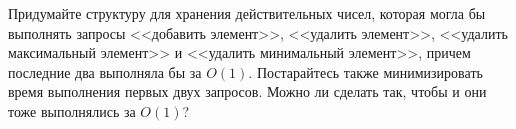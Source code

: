 \documentclass{article}
\begin{document}
Придумайте структуру для хранения действительных чисел, которая могла бы выполнять запросы <<добавить элемент>>,
<<удалить элемент>>, <<удалить максимальный элемент>> и <<удалить минимальный элемент>>, причем последние два выполняла бы за $O(1)$. Постарайтесь также минимизировать время выполнения первых двух запросов. Можно ли сделать так, чтобы и они тоже выполнялись за $O(1)$?
\end{document}
